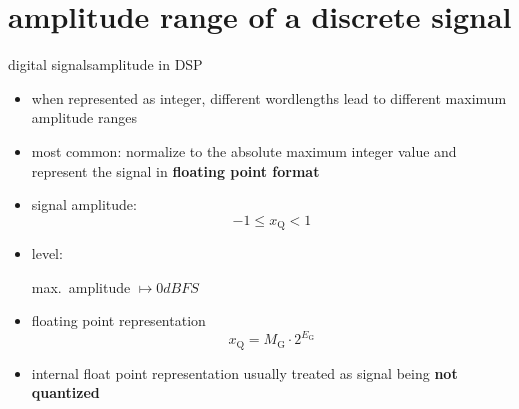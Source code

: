     \section[discrete amplitude range]{amplitude range of a discrete signal}
        \begin{frame}{digital signals}{amplitude in DSP}
            \begin{itemize}
                \item<1->   when represented as integer, different wordlengths lead to different maximum amplitude ranges
                \item<2->	most common: normalize to the absolute maximum integer value and represent the signal in \textbf{floating point format}
                \item<3->[$\Rightarrow$]   signal amplitude:
                    \begin{equation*}
                        -1 \leq x_{\mathrm{Q}} < 1
                    \end{equation*}
                \item<3->[$\Rightarrow$]	level: \\
                    \begin{center}max.\ amplitude $\mapsto \unit{0}{dBFS}$\end{center}
                \item<4->   floating point representation
                    \begin{equation*}
                        x_{\mathrm{Q}} = M_{\mathrm{G}}\cdot 2^{E_{\mathrm{G}}}
                    \end{equation*}
                \item<5->   internal float point representation usually treated as signal being \textbf{not quantized}
            \end{itemize}
        \end{frame}

